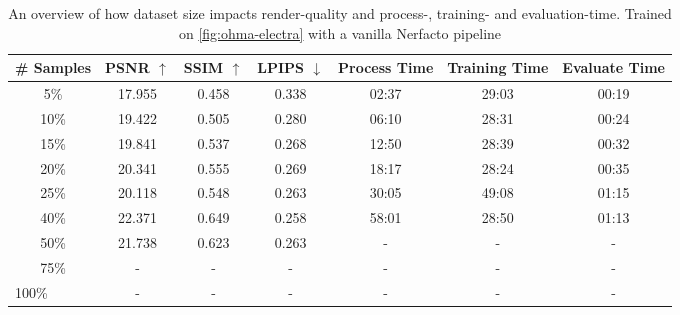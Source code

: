 \begin{table}[h]
\centering
\begin{tabular}{ccccccc}
\hline
\# Samples & PSNR $\uparrow$ & SSIM $\uparrow$ & LPIPS $\downarrow$ & Process Time & Training Time & Evaluate Time \\ \hline
5\%                       & 17.955    & 0.458     & 0.338    & 02:37    & 29:03    & 00:19    \\
10\%                      & 19.422    & 0.505     & 0.280    & 06:10    & 28:31    & 00:24    \\
15\%                      & 19.841    & 0.537     & 0.268    & 12:50    & 28:39    & 00:32    \\
20\%                      & 20.341    & 0.555     & 0.269    & 18:17    & 28:24    & 00:35    \\
25\%                      & 20.118    & 0.548     & 0.263    & 30:05    & 49:08    & 01:15    \\
40\%                      & 22.371    & 0.649     & 0.258    & 58:01    & 28:50    & 01:13    \\
50\%                      & 21.738    & 0.623     & 0.263    & -    & -    & -    \\
75\%                      & -    & -     & -    & -    & -    & -    \\
\multicolumn{1}{l}{100\%} & -    & -     & -    & -    & -    & -    \\ \hline
\end{tabular}
\caption{An overview of how dataset size impacts render-quality and process-, training- and evaluation-time. Trained on \autoref{fig:ohma-electra} with a vanilla Nerfacto pipeline}
\label{tab:colmap-dataset-size}
\end{table}